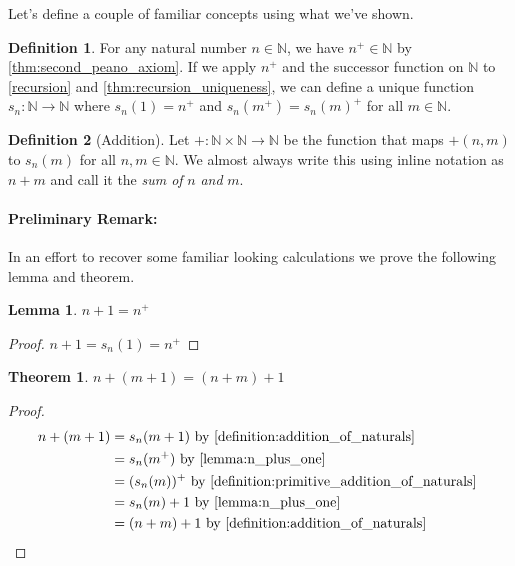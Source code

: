 \documentclass{article}
\theoremstyle{definition}
\newtheorem{definition}{Definition}[section]
\theoremstyle{definition}
\theoremstyle{plain}
\theoremstyle{remark}
\theoremstyle{plain}
\newtheorem{theorem}{Theorem}[section]
\theoremstyle{remark}
\theoremstyle{plain}
\newtheorem{lemma}{Lemma}[section]
\theoremstyle{plain}
\theoremstyle{plain}
\theoremstyle{plain}
\begin{document}
Let's define a couple of familiar concepts using what we've shown.

\begin{definition}
  For any natural number \( n \in \mathbb{N}\), we have 
  \( n^{+} \in \mathbb{N}\) by \autoref{thm:second_peano_axiom}. If we apply 
  \( n^{+} \) and the successor function on \( \mathbb{N} \) to 
  \autoref{recursion} and 
  \autoref{thm:recursion_uniqueness}, we can define a unique function 
  \( s_n : \mathbb{N} \rightarrow \mathbb{N} \) where
  \( s_n(1) = n^{+} \) and \(s_n(m^{+}) = s_n(m)^{+}\) for all 
  \( m \in \mathbb{N} \). 
  \label{definition:primitive_addition_of_naturals}
\end{definition}

\begin{definition}[Addition]
  Let \( + : \mathbb{N} \times \mathbb{N} \rightarrow \mathbb{N} \) be the 
  function that maps \( +(n, m) \) to \( s_n(m) \) for all 
  \( n, m \in \mathbb{N} \). 
  We almost always write this using inline notation as \( n + m \) and call 
  it the \textit{sum of} \( n \) \textit{and} \(m\). 
  \label{definition:addition_of_naturals}
\end{definition}

\paragraph{Preliminary Remark:}
In an effort to recover some familiar looking calculations we prove the 
following lemma and theorem.

\begin{lemma}
  \( n + 1 = n^{+} \)
  \label{lemma:n_plus_one}
\end{lemma}

\begin{proof}
  \( n + 1 = s_n(1) = n^{+} \)
\end{proof}

\begin{theorem}
  \( n + (m + 1) = (n + m) + 1 \)
\end{theorem}

\begin{proof}
  \begin{align*}
    n + (m+1) &= s_n(m+1)  
                 \text{
                   by \autoref{definition:addition_of_naturals}
                 } \\
              &= s_n(m^{+})  
                 \text{
                   by \autoref{lemma:n_plus_one}
                 } \\
              &= (s_n(m))^{+} 
                 \text{
                   by \autoref{definition:primitive_addition_of_naturals}
                 } \\
              &= s_n(m) + 1
                  \text{
                   by \autoref{lemma:n_plus_one}
                 } \\
              &= (n + m) + 1
                   \text{
                   by \autoref{definition:addition_of_naturals}
                 } \\
  \end{align*}
\end{proof}
\end{document}
